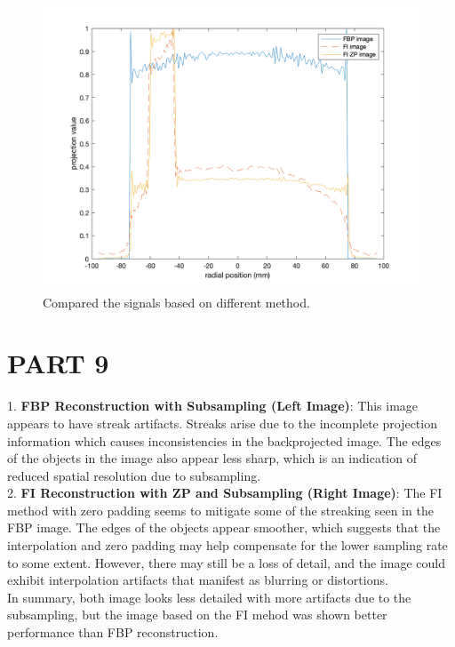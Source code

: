 \documentclass{report}
\begin{document}
\begin{figure}[hb]
    \centering
    \includegraphics[width=1\textwidth]{8.png}
    \caption{Compared the signals based on different method.}
\end{figure}
\newpage 
\section[short]{PART 9}
1. \textbf{FBP Reconstruction with Subsampling (Left Image)}: This image appears to have streak 
artifacts. Streaks arise due to the incomplete projection information which causes 
inconsistencies in the backprojected image. The edges of the objects in the image 
also appear less sharp, which is an indication of reduced spatial resolution due to subsampling.\\

2. \textbf{FI Reconstruction with ZP and Subsampling (Right Image)}: The FI method 
with zero padding seems to mitigate some of the streaking seen in the FBP image. 
The edges of the objects appear smoother, which suggests that the interpolation 
and zero padding may help compensate for the lower sampling rate to some extent. 
However, there may still be a loss of detail, and the image could exhibit interpolation 
artifacts that manifest as blurring or distortions.\\

In summary, both image looks less detailed with more artifacts due to the subsampling,
but the image based on the FI mehod was shown better performance than FBP reconstruction.
\end{document}
